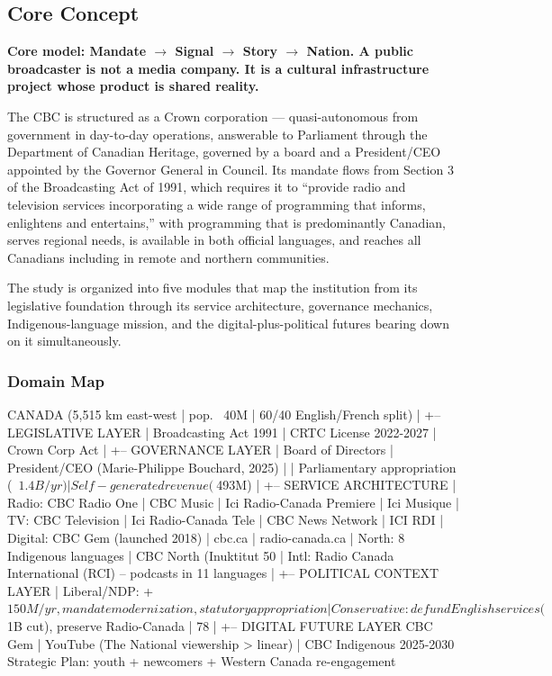 \documentclass[11pt,letterpaper]{article}
\begin{document}
\subsection{Core Concept}

\textbf{Core model: Mandate $\rightarrow$ Signal $\rightarrow$ Story $\rightarrow$ Nation. A public broadcaster is not a media company. It is a cultural infrastructure project whose product is shared reality.}

The CBC is structured as a Crown corporation --- quasi-autonomous from government in day-to-day operations, answerable to Parliament through the Department of Canadian Heritage, governed by a board and a President/CEO appointed by the Governor General in Council. Its mandate flows from Section 3 of the Broadcasting Act of 1991, which requires it to ``provide radio and television services incorporating a wide range of programming that informs, enlightens and entertains,'' with programming that is predominantly Canadian, serves regional needs, is available in both official languages, and reaches all Canadians including in remote and northern communities.

The study is organized into five modules that map the institution from its legislative foundation through its service architecture, governance mechanics, Indigenous-language mission, and the digital-plus-political futures bearing down on it simultaneously.

\subsubsection{Domain Map}

\begin{asciibox}
CANADA (5,515 km east-west | pop. ~40M | 60/40 English/French split)
|
+-- LEGISLATIVE LAYER
|   Broadcasting Act 1991 | CRTC License 2022-2027 | Crown Corp Act
|
+-- GOVERNANCE LAYER
|   Board of Directors | President/CEO (Marie-Philippe Bouchard, 2025)
|   | Parliamentary appropriation (~$1.4B/yr) | Self-generated revenue (~$493M)
|
+-- SERVICE ARCHITECTURE
|   Radio: CBC Radio One | CBC Music | Ici Radio-Canada Premiere | Ici Musique
|   TV:    CBC Television | Ici Radio-Canada Tele | CBC News Network | ICI RDI
|   Digital: CBC Gem (launched 2018) | cbc.ca | radio-canada.ca
|   North:  8 Indigenous languages | CBC North (Inuktitut 50%
|   Intl:  Radio Canada International (RCI) -- podcasts in 11 languages
|
+-- POLITICAL CONTEXT LAYER
|   Liberal/NDP: +$150M/yr, mandate modernization, statutory appropriation
|   Conservative: defund English services (~$1B cut), preserve Radio-Canada
|   78%
|
+-- DIGITAL FUTURE LAYER
    CBC Gem | YouTube (The National viewership > linear) | CBC Indigenous
    2025-2030 Strategic Plan: youth + newcomers + Western Canada re-engagement
\end{asciibox}
\end{document}
